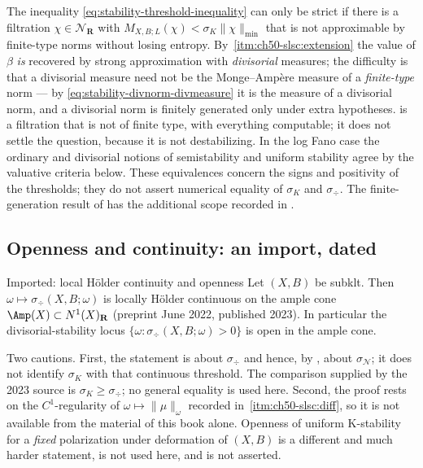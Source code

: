 \begin{remark}
\label{rem:ch50-gap-mechanism}
The inequality \eqref{eq:stability-threshold-inequality} can only be strict
if there is a filtration $\chi\in\mathcal N_{\mathbf R}$ with
$M_{X,B;L}(\chi)<\sigma_K\|\chi\|_{\min}$ that is not approximable by
finite-type norms without losing entropy.  By
\,\cref{itm:ch50-slsc:extension} the value of
$\beta$ \emph{is} recovered by strong approximation with
\emph{divisorial} measures; the difficulty is that a divisorial measure
need not be the Monge--Amp\`ere measure of a \emph{finite-type} norm ---
by \eqref{eq:stability-divnorm-divmeasure} it is the measure of a
divisorial norm, and a divisorial norm is finitely generated only under
extra hypotheses.   is a filtration that is not of
finite type, with everything computable; it does not settle the question,
because it is not destabilizing.  In the log Fano case the ordinary and divisorial notions of semistability
and uniform stability agree by the valuative criteria below.  These
equivalences concern the signs and positivity of the thresholds; they
do not assert numerical equality of $\sigma_K$ and $\sigma_{\div}$.
The finite-generation result of \cite{LXZ22} has the additional scope
recorded in .
\end{remark}

\subsection{Openness and continuity: an import, dated}
\label{sec:ch50-openness}

\begin{important}{Imported: local H\"older continuity and openness}
\label{imp:ch50-openness}
Let $(X,B)$ be subklt.  Then
$\omega\mapsto\sigma_{\div}(X,B;\omega)$ is locally H\"older continuous
on the ample cone $\Amp(X)\subset N^1(X)_{\mathbf R}$
\cite[Theorem~4.12]{BJKS2} (preprint June 2022, published 2023).  In
particular the divisorial-stability locus
$\{\omega:\sigma_{\div}(X,B;\omega)>0\}$ is open in the ample cone.

Two cautions.  First, the statement is about $\sigma_{\div}$ and hence,
by , about $\sigma_{\mathcal N}$;
it does not identify $\sigma_K$ with that continuous threshold.
The comparison supplied by the 2023 source is
$\sigma_K\ge\sigma_{\div}$; no general equality is used here.  Second, the proof rests on the $C^1$-regularity of
$\omega\mapsto\|\mu\|_\omega$ recorded in
\,\cref{itm:ch50-slsc:diff}, so it is not
available from the material of this book alone.  Openness of uniform
K-stability for a \emph{fixed} polarization under deformation of $(X,B)$
is a different and much harder statement, is not used here, and is not
asserted.
\end{important}

